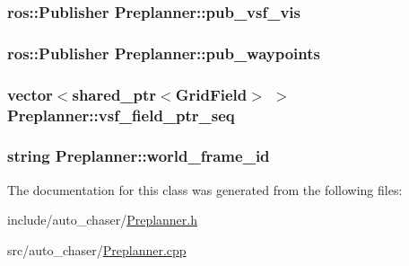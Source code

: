 \subsubsection[{\texorpdfstring{pub\+\_\+vsf\+\_\+vis}{pub_vsf_vis}}]{\setlength{\rightskip}{0pt plus 5cm}ros\+::\+Publisher Preplanner\+::pub\+\_\+vsf\+\_\+vis\hspace{0.3cm}{\ttfamily [private]}}\hypertarget{class_preplanner_a8dafcd99dc50e89404c4f33a688eba6c}{}\label{class_preplanner_a8dafcd99dc50e89404c4f33a688eba6c}
\subsubsection[{\texorpdfstring{pub\+\_\+waypoints}{pub_waypoints}}]{\setlength{\rightskip}{0pt plus 5cm}ros\+::\+Publisher Preplanner\+::pub\+\_\+waypoints\hspace{0.3cm}{\ttfamily [private]}}\hypertarget{class_preplanner_a87dc12e474ee43c9e2b095ec64ab08ce}{}\label{class_preplanner_a87dc12e474ee43c9e2b095ec64ab08ce}
\subsubsection[{\texorpdfstring{vsf\+\_\+field\+\_\+ptr\+\_\+seq}{vsf_field_ptr_seq}}]{\setlength{\rightskip}{0pt plus 5cm}vector$<$shared\+\_\+ptr$<${\bf Grid\+Field}$>$ $>$ Preplanner\+::vsf\+\_\+field\+\_\+ptr\+\_\+seq\hspace{0.3cm}{\ttfamily [private]}}\hypertarget{class_preplanner_aab0f91e34b86eaa581c7642ba5059308}{}\label{class_preplanner_aab0f91e34b86eaa581c7642ba5059308}
\subsubsection[{\texorpdfstring{world\+\_\+frame\+\_\+id}{world_frame_id}}]{\setlength{\rightskip}{0pt plus 5cm}string Preplanner\+::world\+\_\+frame\+\_\+id\hspace{0.3cm}{\ttfamily [private]}}\hypertarget{class_preplanner_a08cb79c25bd4ded139a572672e4492cd}{}\label{class_preplanner_a08cb79c25bd4ded139a572672e4492cd}


The documentation for this class was generated from the following files\+:\begin{DoxyCompactItemize}
\item 
include/auto\+\_\+chaser/\hyperlink{_preplanner_8h}{Preplanner.\+h}\item 
src/auto\+\_\+chaser/\hyperlink{_preplanner_8cpp}{Preplanner.\+cpp}\end{DoxyCompactItemize}
